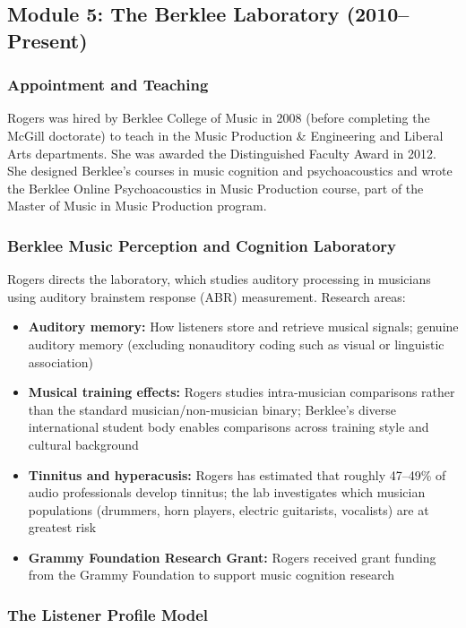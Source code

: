 \documentclass[11pt,letterpaper]{article}
\begin{document}
\subsection{Module 5: The Berklee Laboratory (2010--Present)}

\subsubsection{Appointment and Teaching}

Rogers was hired by Berklee College of Music in 2008 (before completing the McGill doctorate) to teach in the Music Production \& Engineering and Liberal Arts departments. She was awarded the Distinguished Faculty Award in 2012. She designed Berklee's courses in music cognition and psychoacoustics and wrote the Berklee Online Psychoacoustics in Music Production course, part of the Master of Music in Music Production program.

\subsubsection{Berklee Music Perception and Cognition Laboratory}

Rogers directs the laboratory, which studies auditory processing in musicians using auditory brainstem response (ABR) measurement. Research areas:

\begin{itemize}[leftmargin=2em]
  \item \textbf{Auditory memory:} How listeners store and retrieve musical signals; genuine auditory memory (excluding nonauditory coding such as visual or linguistic association)
  \item \textbf{Musical training effects:} Rogers studies intra-musician comparisons rather than the standard musician/non-musician binary; Berklee's diverse international student body enables comparisons across training style and cultural background
  \item \textbf{Tinnitus and hyperacusis:} Rogers has estimated that roughly 47--49\% of audio professionals develop tinnitus; the lab investigates which musician populations (drummers, horn players, electric guitarists, vocalists) are at greatest risk
  \item \textbf{Grammy Foundation Research Grant:} Rogers received grant funding from the Grammy Foundation to support music cognition research
\end{itemize}

\subsubsection{The Listener Profile Model}
\end{document}
